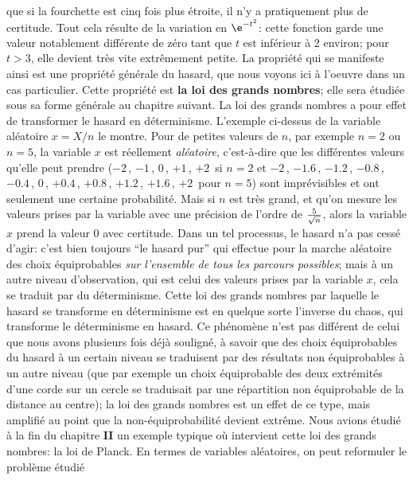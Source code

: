 que si la fourchette est cinq fois plus \'etroite, il n'y a pratiquement
plus de certitude. Tout cela r\'esulte de la variation en $\e^{-t^2}$:  cette
fonction garde une valeur notablement diff\'erente de z\'ero tant que
$t$ est inf\'erieur \`a 2 environ; pour $t > 3$, elle devient tr\`es vite
extr\^emement petite.
\medskip
La propri\'et\'e qui se manifeste ainsi est une propri\'et\'e g\'en\'erale 
du hasard, que nous voyons ici \`a l'oeuvre dans un cas particulier. Cette
propri\'et\'e est {\bf la loi des grands nombres}; elle sera \'etudi\'ee 
sous sa forme g\'en\'erale au chapitre suivant. La loi des grands
nombres a pour effet de transformer le hasard en d\'eterminisme.
L'exemple ci-dessus de la variable al\'eatoire $x = X/n$ le montre. Pour
de petites valeurs de  $n$, par exemple $n=2$ ou $n=5$, la variable $x$
est r\'eellement {\it al\'eatoire}, c'est-\`a-dire que les diff\'erentes
valeurs qu'elle peut prendre ($-2\,$, $-1\,$, $0\,$, $+1\,$, $+2\,$ si 
$n=2$ et $-2\,$, $-1.6\,$, $-1.2\,$,  $-0.8\,$, $-0.4\,$, $0\,$, $+0.4\,$,
$+0.8\,$, $+1.2\,$, $+1.6\,$, $+2\,$ pour $n=5$) sont impr\'evisibles et 
ont seulement une certaine probabilit\'e. Mais si $n$ est tr\`es grand,
et qu'on mesure les valeurs prises par la variable avec une pr\'ecision
de l'ordre de  $5\over \sqrt{n}$, alors la variable $x$ prend la valeur 0
avec certitude. Dans un tel processus, le hasard n'a pas cess\'e d'agir:
c'est bien toujours ``le hasard pur'' qui effectue pour la marche
al\'eatoire des choix \'equiprobables {\it sur l'ensemble de tous les
parcours possibles}; mais \`a un autre niveau d'observation, qui est
celui des valeurs prises par la variable $x$, cela se traduit par du
d\'eterminisme.  
\medskip 
Cette loi des grands nombres par laquelle le hasard se transforme en
d\'eterminisme est en quelque sorte l'inverse  du chaos, qui transforme
le d\'eterminisme en hasard. Ce ph\'enom\`ene n'est pas diff\'erent de
celui que nous avons plusieurs  fois d\'ej\`a soulign\'e, \`a savoir que
des choix \'equiprobables du hasard \`a un certain niveau se traduisent
par des r\'esultats non \'equiprobables \`a un autre niveau (que par
exemple un choix \'equiprobable des deux extr\'emit\'es d'une corde sur
un cercle se traduisait par une r\'epartition non \'equiprobable de la
distance au centre); la loi des grands nombres est un effet de ce type,
mais amplifi\'e au point que la non-\'equiprobabilit\'e devient extr\^eme.
\medskip
Nous avions \'etudi\'e \`a la fin du chapitre {\bf II} un exemple typique 
o\`u intervient cette loi des grands nombres: la loi de Planck. En termes 
de variables al\'eatoires, on peut reformuler le probl\`eme \'etudi\'e 
